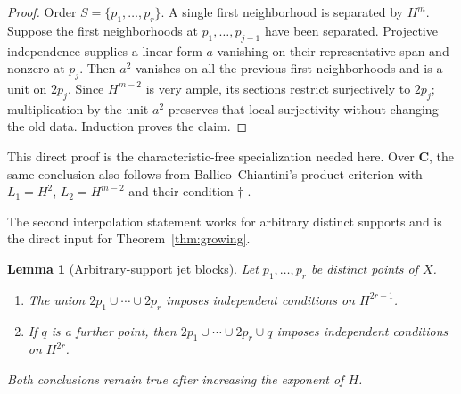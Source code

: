 \documentclass[11pt]{article}
\newtheorem{lemma}[theorem]{Lemma}
\newcommand{\CC}{\mathbf C}
\begin{document}
\begin{proof}
Order $S=\{p_1,\ldots,p_r\}$.  A single first neighborhood is separated by
$H^m$.  Suppose the first neighborhoods at
$p_1,\ldots,p_{j-1}$ have been separated.  Projective independence supplies
a linear form $a$ vanishing on their representative span and nonzero at
$p_j$.  Then $a^2$ vanishes on all the previous first neighborhoods and is a
unit on $2p_j$.  Since $H^{m-2}$ is very ample, its sections restrict
surjectively to $2p_j$; multiplication by the unit $a^2$ preserves that local
surjectivity without changing the old data.  Induction proves the claim.
\end{proof}

This direct proof is the characteristic-free specialization needed here.
Over $\CC$, the same conclusion also follows from Ballico--Chiantini's
product criterion with $L_1=H^2$, $L_2=H^{m-2}$ and their condition
$\dagger$ \cite[Definition~3.1 and Theorem~3.5]{BallicoChiantini2021}.

The second interpolation statement works for arbitrary distinct supports and
is the direct input for Theorem~\ref{thm:growing}.

\begin{lemma}[Arbitrary-support jet blocks]\label{lem:arbitrary-blocks}
Let $p_1,\ldots,p_r$ be distinct points of $X$.
\begin{enumerate}[label=(\roman*)]
\item The union $2p_1\cup\cdots\cup2p_r$ imposes independent conditions on
$H^{2r-1}$.
\item If $q$ is a further point, then
$2p_1\cup\cdots\cup2p_r\cup q$ imposes independent conditions on $H^{2r}$.
\end{enumerate}
Both conclusions remain true after increasing the exponent of $H$.
\end{lemma}
\end{document}
